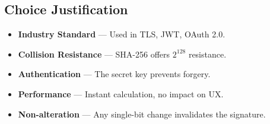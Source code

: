 \subsection{Choice Justification}

\begin{successbox}
\begin{itemize}[nosep]
    \item \textbf{Industry Standard} — Used in TLS, JWT, OAuth 2.0.
    \item \textbf{Collision Resistance} — SHA-256 offers $2^{128}$ resistance.
    \item \textbf{Authentication} — The secret key prevents forgery.
    \item \textbf{Performance} — Instant calculation, no impact on UX.
    \item \textbf{Non-alteration} — Any single-bit change invalidates the signature.
\end{itemize}
\end{successbox}


